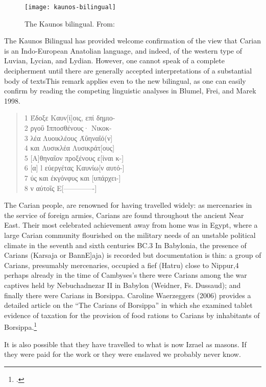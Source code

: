 \begin{figure}[htbp]
\texttt{[image: kaunos-bilingual]}
\caption{The Kaunos bilingual. From:\protect\cite{frei1997}}
\end{figure}

The Kaunos Bilingual has provided welcome confirmation of the view
that Carian is an Indo-European Anatolian language, and indeed, of the western type of
Luvian, Lycian, and Lydian. However, one cannot speak of a complete decipherment until
there are generally accepted interpretations of a substantial body of textsThis 
remark applies even to the new bilingual, as one can easily confirm by
reading the competing linguistic analyses in Blumel, Frei, and Marek 1998.

\begin{quote}
1 Έδοξε Καυν[ί]οις, επί δημιο-\\
2 ργοΰ Ίπποσθένους· Νικοκ-\\
3 λέα Λυοικλέους Άΰηναΐό(ν]\\
4 και Λυσικλέα Λυσικράτ[ους]\\
5 [Α]θηναΐον προξένους ε[ίναι κ-]\\
6 [α] l εύεργέτας Καυνίω[ν αυτό-]\\
7 ύς και έκγόνφυς και [υπάρχει-]\\
8 ν αύτοΐς Ε[-------------]\\
\end{quote}



The Carian people, are renowned for having travelled widely: as mercenaries in the service of foreign armies, Carians are found
throughout the ancient Near East. Their most celebrated achievement away from home was in
Egypt, where a large Carian community flourished on the military needs of an unstable political
climate in the seventh and sixth centuries BC.3 In Babylonia, the presence of Carians (Karsaja or
BannE]aja) is recorded but documentation is thin: a group of Carians, presumably mercenaries,
occupied a fief (Hatru) close to Nippur,4 perhaps already in the time of Cambyses's there were
Carians among the war captives held by Nebuchadnezar II in Babylon (Weidner, Fs. Dussaud);
and finally there were Carians in Borsippa. Caroline Waerzeggers (2006) provides a detailed
article on the \enquote{The Carians of Borsippa} in which she examined tablet evidence of taxation
for the provision of food rations to Carians by inhabitants of Borsippa.\footcite{caroline2006}

It is also possible that they have travelled to what is now Izrael as masons. If they were paid for the work or they were enslaved we probably never know.

